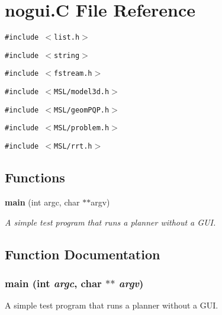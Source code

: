 \section{nogui.C File Reference}
\label{nogui_C}
{\tt \#include $<$list.h$>$}\par
{\tt \#include $<$string$>$}\par
{\tt \#include $<$fstream.h$>$}\par
{\tt \#include $<$MSL/model3d.h$>$}\par
{\tt \#include $<$MSL/geom\-PQP.h$>$}\par
{\tt \#include $<$MSL/problem.h$>$}\par
{\tt \#include $<$MSL/rrt.h$>$}\par
\subsection*{Functions}
\begin{CompactItemize}
\item 
{\bf main} (int argc, char $\ast$$\ast$argv)
\begin{CompactList}\small\item\em A simple test program that runs a planner without a GUI.\item\end{CompactList}\end{CompactItemize}


\subsection{Function Documentation}
\subsubsection{\setlength{\rightskip}{0pt plus 5cm}main (int {\em argc}, char $\ast$$\ast$ {\em argv})}\label{nogui_C_a0}


A simple test program that runs a planner without a GUI.

